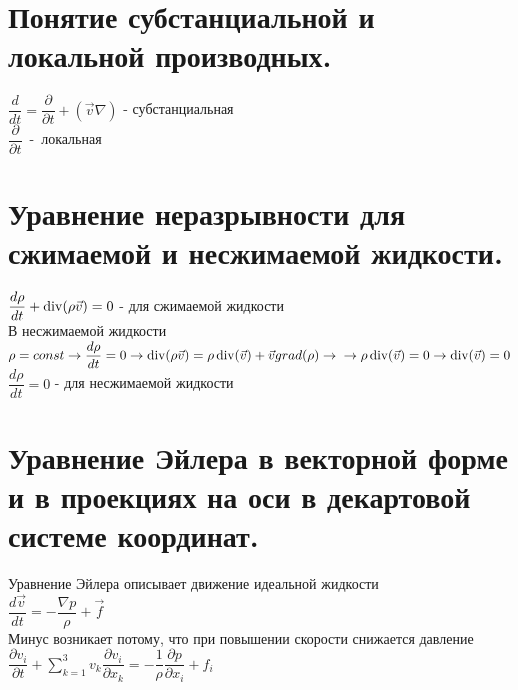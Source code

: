 \newcommand{\colontitulAutors}{edombek, astronom\_v\_cube et al.}
\newcommand{\colontitulYear}{2022}
\newcommand{\colontitulEducationalSubject}{МЕХАНИКА СПЛОШНЫХ СРЕД}
\newcommand{\colontitulTeacher}{С.~Н.~Гурбатов}



\newcommand{\sumk}{\sum\limits_{k=1}^3}


	\small
	\begin{multicols*}{2}
		\section{Понятие субстанциальной и локальной производных.}
		$\dfrac{d}{dt}=\dfrac{\partial}{\partial t}+(\vec{v}\nabla)$ - субстанциальная \\
		$\dfrac{\partial}{\partial t}$~-~локальная
		
		\section{Уравнение неразрывности для сжимаемой и несжимаемой жидкости.}
		$\dfrac{d\rho}{dt}+\operatorname{div}(\rho \vec{v})=0$ - для сжимаемой жидкости \\
		В несжимаемой жидкости $\rho = const \rightarrow \dfrac{d\rho}{dt}=0 \rightarrow \operatorname{div}(\rho\vec{v}) = \rho \operatorname{div}(\vec{v}) + \vec{v} grad(\rho) \rightarrow\\\rightarrow \rho \operatorname{div}(\vec{v}) = 0 \rightarrow \operatorname{div}(\vec{v})=0$\\
		$\dfrac{d\rho}{dt}=0$ - для несжимаемой жидкости
		
		\section{Уравнение Эйлера в векторной форме и в проекциях на оси в декартовой системе координат.}
		Уравнение Эйлера описывает движение идеальной жидкости\\
		$\dfrac{d\vec{v}}{dt}=-\dfrac{\nabla p}{\rho}+\vec{f}$ \\
		Минус возникает потому, что при повышении скорости снижается давление\\
		$\dfrac{\partial v_i}{\partial t}+\sumk v_k\dfrac{\partial v_i}{\partial x_k}=-\dfrac{1}{\rho}\dfrac{\partial p}{\partial x_i}+f_i$
		

\end{multicols*}
